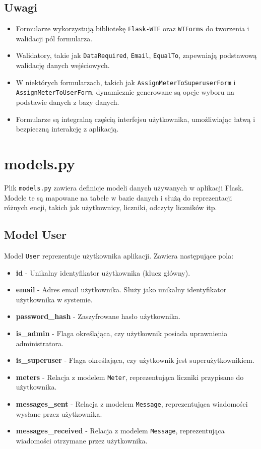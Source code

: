\documentclass[12pt,a4paper]{report}
\begin{document}
\subsection{Uwagi}
\begin{itemize}
    \item Formularze wykorzystują bibliotekę \texttt{Flask-WTF} oraz \texttt{WTForms} do tworzenia i walidacji pól formularza.

    \item Walidatory, takie jak \texttt{DataRequired}, \texttt{Email}, \texttt{EqualTo}, zapewniają podstawową walidację danych wejściowych.

    \item W niektórych formularzach, takich jak \texttt{AssignMeterToSuperuserForm} i \texttt{AssignMeterToUserForm}, dynamicznie generowane są opcje wyboru na podstawie danych z bazy danych.

    \item Formularze są integralną częścią interfejsu użytkownika, umożliwiając łatwą i bezpieczną interakcję z aplikacją.
\end{itemize}

\section{models.py}
\label{sec:models}

Plik \texttt{models.py} zawiera definicje modeli danych używanych w aplikacji Flask. Modele te są mapowane na tabele w bazie danych i służą do reprezentacji różnych encji, takich jak użytkownicy, liczniki, odczyty liczników itp.

\subsection{Model User}
Model \texttt{User} reprezentuje użytkownika aplikacji. Zawiera następujące pola:
\begin{itemize}
    \item \textbf{id} - Unikalny identyfikator użytkownika (klucz główny).
    \item \textbf{email} - Adres email użytkownika. Służy jako unikalny identyfikator użytkownika w systemie.
    \item \textbf{password\_hash} - Zaszyfrowane hasło użytkownika.
    \item \textbf{is\_admin} - Flaga określająca, czy użytkownik posiada uprawnienia administratora.
    \item \textbf{is\_superuser} - Flaga określająca, czy użytkownik jest superużytkownikiem.
    \item \textbf{meters} - Relacja z modelem \texttt{Meter}, reprezentująca liczniki przypisane do użytkownika.
    \item \textbf{messages\_sent} - Relacja z modelem \texttt{Message}, reprezentująca wiadomości wysłane przez użytkownika.
    \item \textbf{messages\_received} - Relacja z modelem \texttt{Message}, reprezentująca wiadomości otrzymane przez użytkownika.
\end{itemize}
\end{document}
